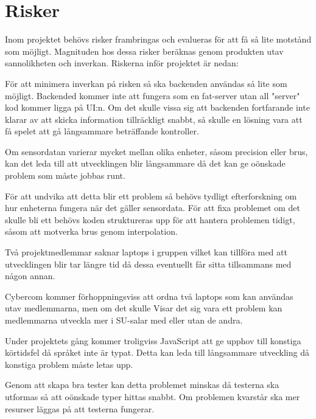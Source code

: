 \section{Risker}
Inom projektet behövs risker frambringas och evalueras för att få så lite motstånd som möjligt. 
Magnituden hos dessa risker beräknas genom produkten utav sannolikheten och inverkan. 
Riskerna inför projektet är nedan:

{
    För att minimera inverkan på risken så ska backenden användas så lite som möjligt.
    Backended kommer inte att fungera som en fat-server utan all "server" kod kommer ligga på UI:n. 
    Om det skulle vissa sig att backenden fortfarande inte klarar av att skicka information tillräckligt snabbt, 
    så skulle en lösning vara att få spelet att gå långsammare beträffande kontroller.
}

{
    Om sensordatan varierar mycket mellan olika enheter, såsom precision eller brus,
    kan det leda till att utvecklingen blir långsammare då det kan ge oönskade problem som måste jobbas runt.

    För att undvika att detta blir ett problem så behövs tydligt efterforskning om hur enheterna fungera när
    det gäller sensordata. För att fixa problemet om det skulle bli ett behövs koden struktureras upp för att
    hantera problemen tidigt, såsom att motverka brus genom interpolation.
}

{
    Två projektmedlemmar saknar laptops i gruppen vilket kan tillföra med att utvecklingen blir tar längre tid
    då dessa eventuellt får sitta tillsammans med någon annan.
    
    Cybercom kommer förhoppningsviss att ordna två laptops som kan användas utav medlemmarna, men om det skulle
    Visar det sig vara ett problem kan medlemmarna utveckla mer i SU-salar med eller utan de andra.
}

{
    Under projektets gång kommer troligviss JavaScript att ge upphov till konstiga körtidsfel då språket inte är typat.
    Detta kan leda till långsammare utveckling då konstiga problem måste letas upp.

    Genom att skapa bra tester kan detta problemet minskas då testerna ska utformas så att oönskade typer hittas snabbt.
    Om problemen kvarstår ska mer resurser läggas på att testerna fungerar.
}

